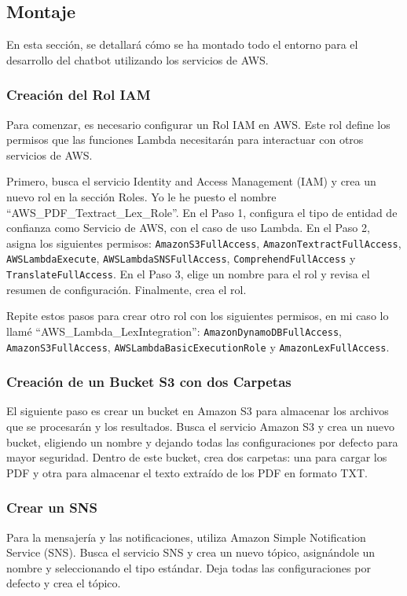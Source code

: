 \subsection{Montaje}\label{montaje-aws}
En esta sección, se detallará cómo se ha montado todo el entorno para el desarrollo del chatbot utilizando los servicios de AWS.

\subsubsection{Creación del Rol IAM}
Para comenzar, es necesario configurar un Rol IAM en AWS. Este rol define los permisos que las funciones Lambda necesitarán para interactuar con otros servicios de AWS.

Primero, busca el servicio Identity and Access Management (IAM) y crea un nuevo rol en la sección Roles. Yo le he puesto el nombre “AWS\_PDF\_Textract\_Lex\_Role”. En el Paso 1, configura el tipo de entidad de confianza como Servicio de AWS, con el caso de uso Lambda. En el Paso 2, asigna los siguientes permisos: \texttt{AmazonS3FullAccess}, \texttt{AmazonTextractFullAccess}, \texttt{AWSLambdaExecute}, \texttt{AWSLambdaSNSFullAccess}, \texttt{ComprehendFullAccess} y \texttt{TranslateFullAccess}. En el Paso 3, elige un nombre para el rol y revisa el resumen de configuración. Finalmente, crea el rol.

Repite estos pasos para crear otro rol con los siguientes permisos, en mi caso lo llamé “AWS\_Lambda\_LexIntegration”: \texttt{AmazonDynamoDBFullAccess}, \texttt{AmazonS3FullAccess}, \texttt{AWSLambdaBasicExecutionRole} y \texttt{AmazonLexFullAccess}.

\subsubsection{Creación de un Bucket S3 con dos Carpetas}
El siguiente paso es crear un bucket en Amazon S3 para almacenar los archivos que se procesarán y los resultados. Busca el servicio Amazon S3 y crea un nuevo bucket, eligiendo un nombre y dejando todas las configuraciones por defecto para mayor seguridad. Dentro de este bucket, crea dos carpetas: una para cargar los PDF y otra para almacenar el texto extraído de los PDF en formato TXT.

\subsubsection{Crear un SNS}
Para la mensajería y las notificaciones, utiliza Amazon Simple Notification Service (SNS). Busca el servicio SNS y crea un nuevo tópico, asignándole un nombre y seleccionando el tipo estándar. Deja todas las configuraciones por defecto y crea el tópico.

